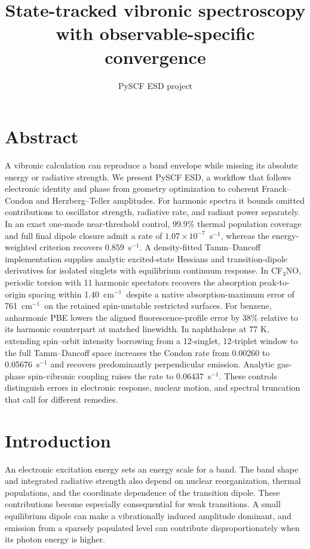 \documentclass[11pt]{article}
\title{\textbf{State-tracked vibronic spectroscopy with observable-specific convergence}}
\author{PySCF ESD project}
\date{}
\newcommand{\wn}{\ensuremath{\mathrm{cm}^{-1}}}
\begin{document}
\maketitle

\section*{Abstract}
A vibronic calculation can reproduce a band envelope while missing its absolute energy or radiative strength. We present PySCF ESD, a workflow that follows electronic identity and phase from geometry optimization to coherent Franck--Condon and Herzberg--Teller amplitudes. For harmonic spectra it bounds omitted contributions to oscillator strength, radiative rate, and radiant power separately. In an exact one-mode near-threshold control, 99.9\% thermal population coverage and full final dipole closure admit a rate of $1.07\times10^{-7}$~s$^{-1}$, whereas the energy-weighted criterion recovers $0.859$~s$^{-1}$. A density-fitted Tamm--Dancoff implementation supplies analytic excited-state Hessians and transition-dipole derivatives for isolated singlets with equilibrium continuum response. In CF$_3$NO, periodic torsion with 11 harmonic spectators recovers the absorption peak-to-origin spacing within 1.40~\wn\ despite a native absorption-maximum error of 761~\wn\ on the retained spin-unstable restricted surfaces. For benzene, anharmonic PBE lowers the aligned fluorescence-profile error by 38\% relative to its harmonic counterpart at matched linewidth. In naphthalene at 77 K, extending spin--orbit intensity borrowing from a 12-singlet, 12-triplet window to the full Tamm--Dancoff space increases the Condon rate from 0.00260 to 0.05676~s$^{-1}$ and recovers predominantly perpendicular emission. Analytic gas-phase spin-vibronic coupling raises the rate to 0.06437~s$^{-1}$. These controls distinguish errors in electronic response, nuclear motion, and spectral truncation that call for different remedies.

\section{Introduction}

An electronic excitation energy sets an energy scale for a band. The band shape and integrated radiative strength also depend on nuclear reorganization, thermal populations, and the coordinate dependence of the transition dipole. These contributions become especially consequential for weak transitions. A small equilibrium dipole can make a vibrationally induced amplitude dominant, and emission from a sparsely populated level can contribute disproportionately when its photon energy is higher.
\end{document}
